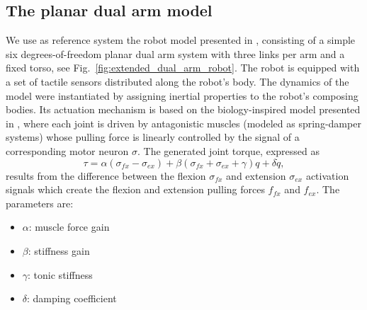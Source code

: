 \subsection{The planar dual arm model}
We use as reference system the robot model presented in \cite{Mannella2018Knowyourbody,Marcel2022Learningreachown}, consisting of a simple six degrees-of-freedom planar dual arm system with three links per arm and a fixed torso, see Fig.~\ref{fig:extended_dual_arm_robot}. The robot is equipped with a set of tactile sensors distributed along the robot's body. The dynamics of the model were instantiated by assigning inertial properties to the robot's composing bodies. Its actuation mechanism is based on the biology-inspired model presented in \cite{Ekeberg1993combinedneuronalmechanical,Wadden1998neuromechanicalmodel, Shim2012Chaoticexplorationlearning}, where each joint is driven by antagonistic muscles (modeled as spring-damper systems) whose pulling force is linearly controlled by the signal of a corresponding motor neuron $\sigma$. The generated joint torque, expressed as
\begin{equation}\label{eq:antagonistic_torque}
	\tau = \alpha \left(\sigma_{fx} - \sigma_{ex}\right)  + \beta \left(\sigma_{fx} + \sigma_{ex} + \gamma \right) q + \delta \dot{q},
\end{equation}
results from the difference between the flexion $ \sigma_{fx} $ and extension $\sigma_{ex}$ activation signals which create the flexion and extension pulling forces $ f_{fx}$ and $f_{ex} $. The parameters are:
\begin{itemize}
	\item $\alpha$: muscle force gain
	\item $\beta$: stiffness gain
	\item $\gamma$: tonic stiffness	
	\item $\delta$: damping coefficient
\end{itemize}


